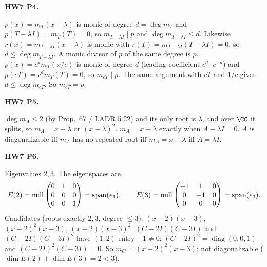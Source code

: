\documentclass[10pt]{scrartcl}
\begin{document}
\begin{prob}
\textbf{HW7 P4. }\par 
{}
\begin{enumerate}[(a)]
  \ii $p(x)=m_T(x+\lambda)$ is monic of degree $d=\deg m_T$ and $p(T-\lambda I)=m_T(T)=0$, so $m_{T-\lambda I}\mid p$ and $\deg m_{T-\lambda I}\le d$. Likewise $r(x)=m_{T-\lambda I}(x-\lambda)$ is monic with $r(T)=m_{T-\lambda I}(T-\lambda I)=0$, so $d\le\deg m_{T-\lambda I}$. A monic divisor of $p$ of the same degree is $p$.
  \ii $p(x)=c^dm_T(x/c)$ is monic of degree $d$ (leading coefficient $c^d\cdot c^{-d}$) and $p(cT)=c^dm_T(T)=0$, so $m_{cT}\mid p$. The same argument with $cT$ and $1/c$ gives $d\le\deg m_{cT}$. So $m_{cT}=p$.
\end{enumerate}
\end{prob}

\begin{prob}
\textbf{HW7 P5. }\par 
{}
$\deg m_A\le2$ (by Prop.~67 / LADR 5.22) and its only root is $\lambda$, and over $\CC$ it splits, so $m_A=x-\lambda$ or $(x-\lambda)^2$. $m_A=x-\lambda$ exactly when $A-\lambda I=0$. $A$ is diagonalizable iff $m_A$ has no repeated root iff $m_A=x-\lambda$ iff $A=\lambda I$.
\end{prob}

\begin{prob}
\textbf{HW7 P6. }\par 
{}
Eigenvalues $2,3$. The eigenspaces are
\[
  E(2)=\operatorname{null}\begin{pmatrix}0&1&0\\0&0&0\\0&0&1\end{pmatrix}=\operatorname{span}(e_1),\qquad
  E(3)=\operatorname{null}\begin{pmatrix}-1&1&0\\0&-1&0\\0&0&0\end{pmatrix}=\operatorname{span}(e_3).
\]
Candidates (roots exactly $2,3$, degree $\le3$): $(x-2)(x-3)$, $(x-2)^2(x-3)$, $(x-2)(x-3)^2$. $(C-2I)(C-3I)$ and $(C-2I)(C-3I)^2$ have $(1,2)$ entry $\mp1\ne0$; $(C-2I)^2=\operatorname{diag}(0,0,1)$ and $(C-2I)^2(C-3I)=0$. So $m_C=(x-2)^2(x-3)$: not diagonalizable ($\dim E(2)+\dim E(3)=2<3$).
\end{prob}
\end{document}
